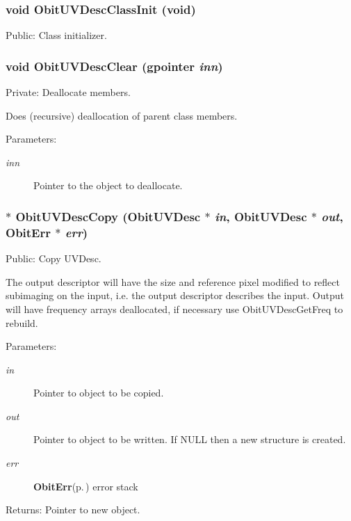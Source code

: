 \subsubsection{\setlength{\rightskip}{0pt plus 5cm}void Obit\-UVDesc\-Class\-Init (void)}\label{ObitUVDesc_8c_a24}


Public: Class initializer. 

\subsubsection{\setlength{\rightskip}{0pt plus 5cm}void Obit\-UVDesc\-Clear (gpointer {\em inn})}\label{ObitUVDesc_8c_a7}


Private: Deallocate members. 

Does (recursive) deallocation of parent class members. \begin{Desc}
\item[Parameters:]
\begin{description}
\item[{\em inn}]Pointer to the object to deallocate. \end{description}
\end{Desc}
\subsubsection{$\ast$ Obit\-UVDesc\-Copy ({\bf Obit\-UVDesc} $\ast$ {\em in}, {\bf Obit\-UVDesc} $\ast$ {\em out}, {\bf Obit\-Err} $\ast$ {\em err})}\label{ObitUVDesc_8c_a11}


Public: Copy UVDesc. 

The output descriptor will have the size and reference pixel modified to reflect subimaging on the input, i.e. the output descriptor describes the input. Output will have frequency arrays deallocated, if necessary use Obit\-UVDesc\-Get\-Freq to rebuild. \begin{Desc}
\item[Parameters:]
\begin{description}
\item[{\em in}]Pointer to object to be copied. \item[{\em out}]Pointer to object to be written. If NULL then a new structure is created. \item[{\em err}]{\bf Obit\-Err}{\rm (p.\,\pageref{structObitErr})} error stack \end{description}
\end{Desc}
\begin{Desc}
\item[Returns:]Pointer to new object. \end{Desc}
